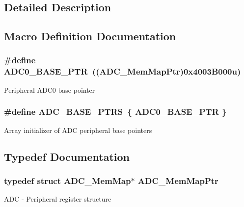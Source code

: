 \subsection{Detailed Description}


\subsection{Macro Definition Documentation}
\hypertarget{group___a_d_c___peripheral_ga6cec2f227a3a37a9fccaa830740f1f5e}{}
\subsubsection[{A\+D\+C0\+\_\+\+B\+A\+S\+E\+\_\+\+P\+T\+R}]{\setlength{\rightskip}{0pt plus 5cm}\#define A\+D\+C0\+\_\+\+B\+A\+S\+E\+\_\+\+P\+T\+R~(({\bf A\+D\+C\+\_\+\+Mem\+Map\+Ptr})0x4003\+B000u)}\label{group___a_d_c___peripheral_ga6cec2f227a3a37a9fccaa830740f1f5e}
Peripheral A\+D\+C0 base pointer \hypertarget{group___a_d_c___peripheral_gaaa8175a3a2f4efaceeed5bd26c0b2d3f}{}
\subsubsection[{A\+D\+C\+\_\+\+B\+A\+S\+E\+\_\+\+P\+T\+R\+S}]{\setlength{\rightskip}{0pt plus 5cm}\#define A\+D\+C\+\_\+\+B\+A\+S\+E\+\_\+\+P\+T\+R\+S~\{ {\bf A\+D\+C0\+\_\+\+B\+A\+S\+E\+\_\+\+P\+T\+R} \}}\label{group___a_d_c___peripheral_gaaa8175a3a2f4efaceeed5bd26c0b2d3f}
Array initializer of A\+D\+C peripheral base pointers 

\subsection{Typedef Documentation}
\hypertarget{group___a_d_c___peripheral_ga1673c677bf7c0ca339c8563e06de75fa}{}
\subsubsection[{A\+D\+C\+\_\+\+Mem\+Map\+Ptr}]{\setlength{\rightskip}{0pt plus 5cm}typedef struct {\bf A\+D\+C\+\_\+\+Mem\+Map}$\ast$ {\bf A\+D\+C\+\_\+\+Mem\+Map\+Ptr}}\label{group___a_d_c___peripheral_ga1673c677bf7c0ca339c8563e06de75fa}
A\+D\+C -\/ Peripheral register structure 